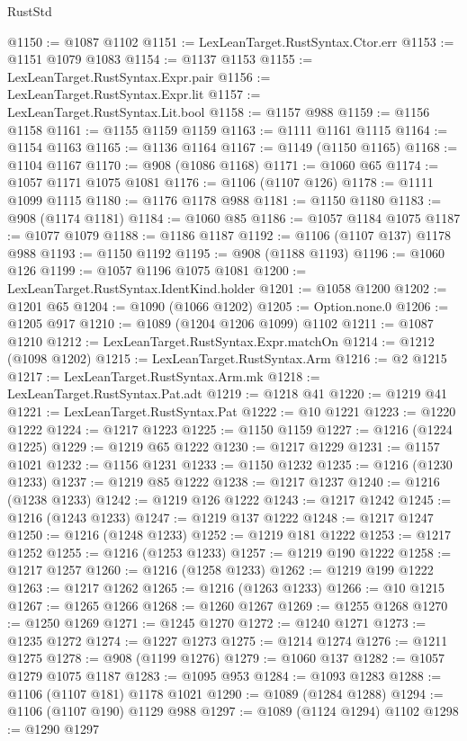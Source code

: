 \begin{lexlean}{RustStd}
\begin{coremodule}
@1150 := @1087 @1102
@1151 := LexLeanTarget.RustSyntax.Ctor.err
@1153 := @1151 @1079 @1083
@1154 := @1137 @1153
@1155 := LexLeanTarget.RustSyntax.Expr.pair
@1156 := LexLeanTarget.RustSyntax.Expr.lit
@1157 := LexLeanTarget.RustSyntax.Lit.bool
@1158 := @1157 @988
@1159 := @1156 @1158
@1161 := @1155 @1159 @1159
@1163 := @1111 @1161 @1115
@1164 := @1154 @1163
@1165 := @1136 @1164
@1167 := @1149 (@1150 @1165)
@1168 := @1104 @1167
@1170 := @908 (@1086 @1168)
@1171 := @1060 @65
@1174 := @1057 @1171 @1075 @1081
@1176 := @1106 (@1107 @126)
@1178 := @1111 @1099 @1115
@1180 := @1176 @1178 @988
@1181 := @1150 @1180
@1183 := @908 (@1174 @1181)
@1184 := @1060 @85
@1186 := @1057 @1184 @1075
@1187 := @1077 @1079
@1188 := @1186 @1187
@1192 := @1106 (@1107 @137) @1178 @988
@1193 := @1150 @1192
@1195 := @908 (@1188 @1193)
@1196 := @1060 @126
@1199 := @1057 @1196 @1075 @1081
@1200 := LexLeanTarget.RustSyntax.IdentKind.holder
@1201 := @1058 @1200
@1202 := @1201 @65
@1204 := @1090 (@1066 @1202)
@1205 := Option.none.{0}
@1206 := @1205 @917
@1210 := @1089 (@1204 @1206 @1099) @1102
@1211 := @1087 @1210
@1212 := LexLeanTarget.RustSyntax.Expr.matchOn
@1214 := @1212 (@1098 @1202)
@1215 := LexLeanTarget.RustSyntax.Arm
@1216 := @2 @1215
@1217 := LexLeanTarget.RustSyntax.Arm.mk
@1218 := LexLeanTarget.RustSyntax.Pat.adt
@1219 := @1218 @41
@1220 := @1219 @41
@1221 := LexLeanTarget.RustSyntax.Pat
@1222 := @10 @1221
@1223 := @1220 @1222
@1224 := @1217 @1223
@1225 := @1150 @1159
@1227 := @1216 (@1224 @1225)
@1229 := @1219 @65 @1222
@1230 := @1217 @1229
@1231 := @1157 @1021
@1232 := @1156 @1231
@1233 := @1150 @1232
@1235 := @1216 (@1230 @1233)
@1237 := @1219 @85 @1222
@1238 := @1217 @1237
@1240 := @1216 (@1238 @1233)
@1242 := @1219 @126 @1222
@1243 := @1217 @1242
@1245 := @1216 (@1243 @1233)
@1247 := @1219 @137 @1222
@1248 := @1217 @1247
@1250 := @1216 (@1248 @1233)
@1252 := @1219 @181 @1222
@1253 := @1217 @1252
@1255 := @1216 (@1253 @1233)
@1257 := @1219 @190 @1222
@1258 := @1217 @1257
@1260 := @1216 (@1258 @1233)
@1262 := @1219 @199 @1222
@1263 := @1217 @1262
@1265 := @1216 (@1263 @1233)
@1266 := @10 @1215
@1267 := @1265 @1266
@1268 := @1260 @1267
@1269 := @1255 @1268
@1270 := @1250 @1269
@1271 := @1245 @1270
@1272 := @1240 @1271
@1273 := @1235 @1272
@1274 := @1227 @1273
@1275 := @1214 @1274
@1276 := @1211 @1275
@1278 := @908 (@1199 @1276)
@1279 := @1060 @137
@1282 := @1057 @1279 @1075 @1187
@1283 := @1095 @953
@1284 := @1093 @1283
@1288 := @1106 (@1107 @181) @1178 @1021
@1290 := @1089 (@1284 @1288)
@1294 := @1106 (@1107 @190) @1129 @988
@1297 := @1089 (@1124 @1294) @1102
@1298 := @1290 @1297

\end{coremodule}
\end{lexlean}
